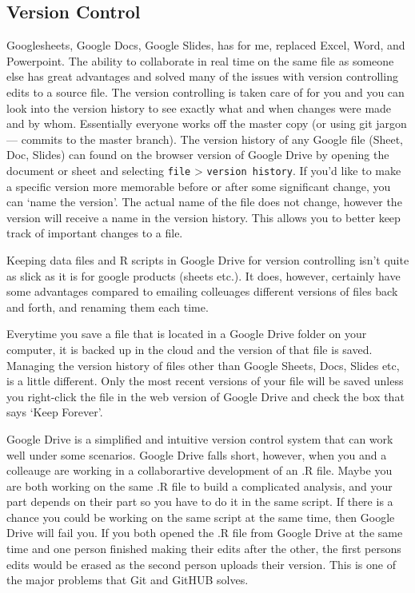\documentclass[]{book}
\begin{document}
\subsection{Version Control}\label{version-control}

Googlesheets, Google Docs, Google Slides, has for me, replaced Excel,
Word, and Powerpoint. The ability to collaborate in real time on the
same file as someone else has great advantages and solved many of the
issues with version controlling edits to a source file. The version
controlling is taken care of for you and you can look into the version
history to see exactly what and when changes were made and by whom.
Essentially everyone works off the master copy (or using git jargon ---
commits to the master branch). The version history of any Google file
(Sheet, Doc, Slides) can found on the browser version of Google Drive by
opening the document or sheet and selecting \texttt{file} \textgreater{}
\texttt{version\ history}. If you'd like to make a specific version more
memorable before or after some significant change, you can `name the
version'. The actual name of the file does not change, however the
version will receive a name in the version history. This allows you to
better keep track of important changes to a file.

Keeping data files and R scripts in Google Drive for version controlling
isn't quite as slick as it is for google products (sheets etc.). It
does, however, certainly have some advantages compared to emailing
colleuages different versions of files back and forth, and renaming them
each time.

Everytime you save a file that is located in a Google Drive folder on
your computer, it is backed up in the cloud and the version of that file
is saved. Managing the version history of files other than Google
Sheets, Docs, Slides etc, is a little different. Only the most recent
versions of your file will be saved unless you right-click the file in
the web version of Google Drive and check the box that says `Keep
Forever'.

Google Drive is a simplified and intuitive version control system that
can work well under some scenarios. Google Drive falls short, however,
when you and a colleauge are working in a collaborartive development of
an .R file. Maybe you are both working on the same .R file to build a
complicated analysis, and your part depends on their part so you have to
do it in the same script. If there is a chance you could be working on
the same script at the same time, then Google Drive will fail you. If
you both opened the .R file from Google Drive at the same time and one
person finished making their edits after the other, the first persons
edits would be erased as the second person uploads their version. This
is one of the major problems that Git and GitHUB solves.
\end{document}
